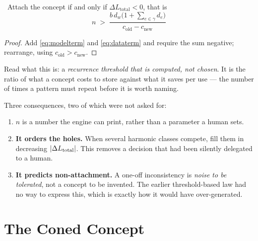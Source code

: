 \begin{theorem}\label{thm:growthlaw}
\Proved\ Attach the concept if and only if $\Delta L_{\text{total}}<0$,
that is
\begin{equation}\label{eq:growthlaw}
  \boxed{\ n\;>\;
  \frac{b\,d_w\bigl(1+\sum_{e\in\gamma}d_e\bigr)}
       {c_{\text{old}}-c_{\text{new}}}\ }
\end{equation}
\end{theorem}
\begin{proof}
Add \eqref{eq:modelterm} and \eqref{eq:dataterm} and require the sum
negative; rearrange, using $c_{\text{old}}>c_{\text{new}}$.
\end{proof}

\begin{intu}\Intu
Read what this is: a \emph{recurrence threshold that is computed, not
chosen}. It is the ratio of what a concept costs to store against what
it saves per use --- the number of times a pattern must repeat before it
is worth naming.
\end{intu}

Three consequences, two of which were not asked for:

\begin{enumerate}
  \item $n$ is a number the engine can print, rather than a parameter a
        human sets.
  \item \textbf{It orders the holes.} When several harmonic classes
        compete, fill them in decreasing $\left\lvert \Delta L_{\text{total}} \right\rvert$.
        This removes a decision that had been silently delegated to a
        human.
  \item \textbf{It predicts non-attachment.} A one-off inconsistency is
        \emph{noise to be tolerated}, not a concept to be invented. The
        earlier threshold-based law had no way to express this, which is
        exactly how it would have over-generated.
\end{enumerate}

\chapter{The Coned Concept}\label{ch:cone}

